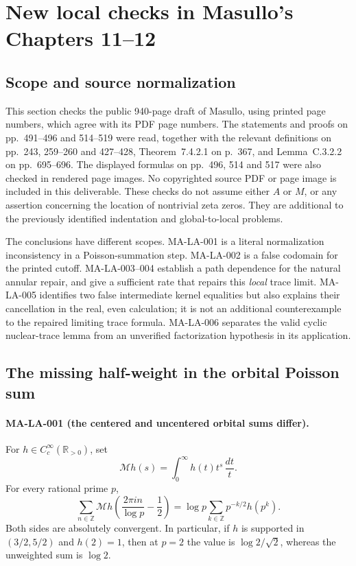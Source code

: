 \section{New local checks in Masullo's Chapters 11--12}
\label{sec:local-source-audit}

\subsection{Scope and source normalization}

This section checks the public 940-page draft of Masullo, using printed
page numbers, which agree with its PDF page numbers.  The statements and
proofs on pp.~491--496 and 514--519 were read, together with the relevant
definitions on pp.~243, 259--260 and 427--428, Theorem~7.4.2.1 on
p.~367, and Lemma~C.3.2.2 on pp.~695--696.  The displayed formulas on
pp.~496, 514 and 517 were also checked in rendered page images.  No
copyrighted source PDF or page image is included in this deliverable.
These checks do not assume either $A$ or $M$, or any assertion concerning
the location of nontrivial zeta zeros.  They are additional to the
previously identified indentation and global-to-local problems.

The conclusions have different scopes.  MA-LA-001 is a literal
normalization inconsistency in a Poisson-summation step.  MA-LA-002 is
a false codomain for the printed cutoff.  MA-LA-003--004 establish a
path dependence for the natural annular repair, and give a sufficient
rate that repairs this \emph{local} trace limit.  MA-LA-005 identifies
two false intermediate kernel equalities but also explains their
cancellation in the real, even calculation; it is not an additional
counterexample to the repaired limiting trace formula.  MA-LA-006
separates the valid cyclic nuclear-trace lemma from an unverified
factorization hypothesis in its application.

\subsection{The missing half-weight in the orbital Poisson sum}

\paragraph{MA-LA-001 (the centered and uncentered orbital sums differ).}
For $h\in C_c^\infty(\mathbb R_{>0})$, set
\[
 \mathcal Mh(s)=\int_0^\infty h(t)t^s\,\frac{dt}{t}.
\]
For every rational prime $p$,
\[
 \sum_{n\in\mathbb Z}
 \mathcal Mh\!\left(\frac{2\pi i n}{\log p}-\frac12\right)
 =\log p\sum_{k\in\mathbb Z}p^{-k/2}h(p^k).
 \tag{MA-LA.1}
\]
Both sides are absolutely convergent.  In particular, if $h$ is
supported in $(3/2,5/2)$ and $h(2)=1$, then at $p=2$ the value is
$\log 2/\sqrt2$, whereas the unweighted sum is $\log 2$.

